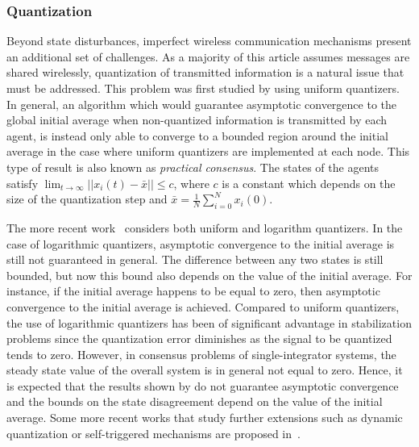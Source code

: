 \documentclass{autart}
\newcommand{\changes}[1]{{\color{blue} #1}}
\renewcommand{\changes}[1]{#1}
\begin{document}
\subsubsection{Quantization}
\changes{Beyond state disturbances, imperfect wireless communication
  mechanisms present an additional set of challenges. } As a majority
of this article assumes messages are shared wirelessly, quantization
of transmitted information is a natural issue that must be
addressed. This problem was first studied by \cite{EG-YC-HY-PA-DC:13}
using uniform quantizers. In general, an algorithm which would
guarantee asymptotic convergence to the global initial average when
non-quantized information is transmitted by each agent, is instead
only able to converge to a bounded region around the initial average
in the case where uniform quantizers are implemented at each
node. This type of result is also known as \emph{practical
  consensus}. The states of the agents satisfy $\lim_{t\rightarrow
  \infty} ||x_i(t)-\bar{x}||\leq c$, where $c$ is a constant which
depends on the size of the quantization step and
$\bar{x}=\frac{1}{N}\sum_{i=0}^Nx_i(0)$.

The more recent work~\citep{ZZ-LZ-FH-LW:15} considers both uniform and
logarithm quantizers. In the case of logarithmic quantizers,
asymptotic convergence to the initial average is still not guaranteed
in general. The difference between any two states is still bounded,
but now this bound also depends on the value of the initial
average. For instance, if the initial average happens to be equal to
zero, then asymptotic convergence to the initial average is
achieved. Compared to uniform quantizers, the use of logarithmic
quantizers has been of significant advantage in stabilization problems
since the quantization error diminishes as the signal to be quantized
tends to zero. However, in consensus problems of single-integrator
systems, the steady state value of the overall system is in general
not equal to zero. Hence, it is expected that the results shown by
\cite{ZZ-LZ-FH-LW:15} do not guarantee asymptotic convergence and the
bounds on the state disagreement depend on the value of the initial
average. Some more recent works that study further extensions such as
dynamic quantization or self-triggered mechanisms are proposed
in~\citep{CDP-PF:13,HL-GC-TH-ZD-WZ-LG:16,XY-JW-KHJ:16,DS-PT-CDP:18}.
\end{document}
